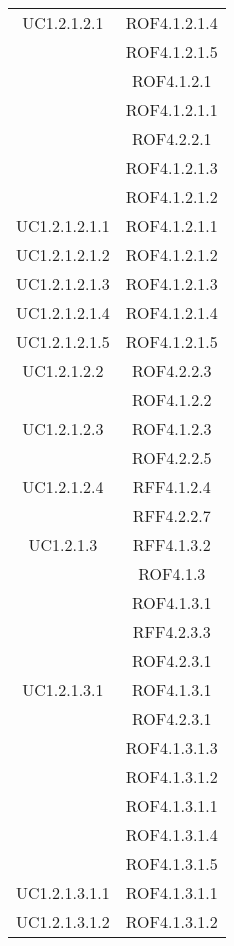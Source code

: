 \begin{longtable}{|c|c|}
\midrule
UC1.2.1.2.1
& ROF4.1.2.1.4\\
& ROF4.1.2.1.5\\
& ROF4.1.2.1\\
& ROF4.1.2.1.1\\
& ROF4.2.2.1\\
& ROF4.1.2.1.3\\
& ROF4.1.2.1.2\\

\midrule
UC1.2.1.2.1.1
& ROF4.1.2.1.1\\

\midrule
UC1.2.1.2.1.2
& ROF4.1.2.1.2\\

\midrule
UC1.2.1.2.1.3
& ROF4.1.2.1.3\\

\midrule
UC1.2.1.2.1.4
& ROF4.1.2.1.4\\

\midrule
UC1.2.1.2.1.5
& ROF4.1.2.1.5\\

\midrule
UC1.2.1.2.2
& ROF4.2.2.3\\
& ROF4.1.2.2\\

\midrule
UC1.2.1.2.3
& ROF4.1.2.3\\
& ROF4.2.2.5\\

\midrule
UC1.2.1.2.4
& RFF4.1.2.4\\
& RFF4.2.2.7\\

\midrule
UC1.2.1.3
& RFF4.1.3.2\\
& ROF4.1.3\\
& ROF4.1.3.1\\
& RFF4.2.3.3\\
& ROF4.2.3.1\\

\midrule
UC1.2.1.3.1
& ROF4.1.3.1\\
& ROF4.2.3.1\\
& ROF4.1.3.1.3\\
& ROF4.1.3.1.2\\
& ROF4.1.3.1.1\\
& ROF4.1.3.1.4\\
& ROF4.1.3.1.5\\

\midrule
UC1.2.1.3.1.1
& ROF4.1.3.1.1\\

\midrule
UC1.2.1.3.1.2
& ROF4.1.3.1.2\\


\end{longtable}
